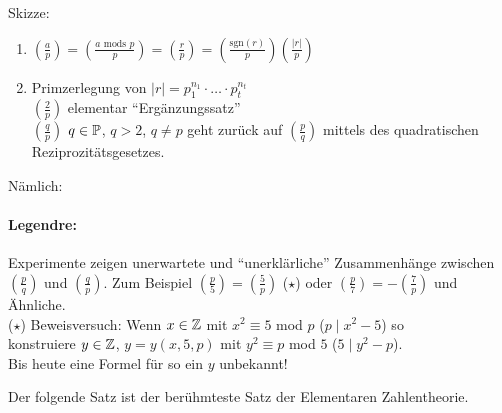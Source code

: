 \documentclass[a4paper,DIV15,BCOR12mm]{article}
\begin{document}
Skizze:\\
\begin{enumerate}
\item $\left(\frac{a}{p}\right)=\left(\frac{a\mbox{ mods }p}{p}\right) = \left(\frac{r}{p}\right) = \left(\frac{\mbox{sgn}(r)}{p}\right)\left(\frac{|r|}{p}\right)$
\item Primzerlegung von $|r|=p_1^{n_1}\cdot \dotsc \cdot p_t^{n_t}$\\
$\left(\frac{2}{p}\right)$ elementar "`Ergänzungssatz"'\\
$\left(\frac{q}{p}\right)$ $q \in \mathbb{P}$, $q>2$, $q \neq p$ geht
zurück auf $\left(\frac{p}{q}\right)$ mittels des quadratischen
Reziprozitätsgesetzes.
\end{enumerate}
Nämlich:
\paragraph{Legendre:} Experimente zeigen unerwartete und "`unerklärliche"'
Zusammenhänge zwischen $\left(\frac{p}{q}\right)$ und
$\left(\frac{q}{p}\right)$. Zum Beispiel
$\left(\frac{p}{5}\right)=\left(\frac{5}{p}\right)$ ($\star$)
oder $\left(\frac{p}{7}\right)=-\left(\frac{7}{p}\right)$ und Ähnliche. \\
($\star$) Beweisversuch: Wenn $x \in \mathbb{Z}$ mit $x^2 \equiv 5$ mod $p$ ($p \mid x^2-5$) so \\
konstruiere $y \in \mathbb{Z}$, $y=y(x,5,p)$ mit $y^2 \equiv p$ mod $5$ ($5 \mid y^2-p$).\\
Bis heute eine Formel für so ein $y$ unbekannt!

Der folgende Satz ist der berühmteste Satz der Elementaren
Zahlentheorie.
\end{document}
